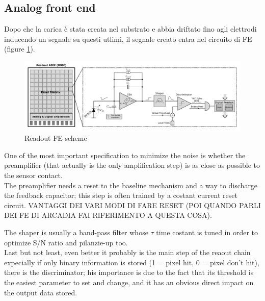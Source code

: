 \begin{titlepage}
\subsection{Analog front end }
Dopo che la carica è stata creata nel substrato e abbia driftato fino agli elettrodi
inducendo un segnale su questi utlimi, il segnale creato entra nel circuito di FE
(figure \ref{fig:readout_scheme}).
\begin{figure}
\centering\includegraphics[width=15cm]{figures/readout_scheme.png}
\caption{Readout FE scheme}
\label{fig:readout_scheme}
\end{figure}

One of the most important specification to minimize the noise is whether the preamplifier
(that actually is the only amplification step) is as close as possible to the sensor contact.\\
The preamplifier needs a reset to the baseline mechanism and a way to discharge
the feedback capacitor; this step is often trained by a costant current reset circuit.
VANTAGGI DEI VARI MODI DI FARE RESET (POI QUANDO PARLI DEI FE DI ARCADIA FAI RIFERIMENTO A QUESTA COSA).

The shaper is usually a band-pass filter whose $\tau$ time costant is tuned in
order to optimize S/N ratio and pilanzie-up too.\\

Last but not least, even better it probably is the main step of the reaout chain
expecially if only binary information is stored (1 = pixel hit, 0 = pixel don't hit),
there is the discriminator; his importance is due to the fact that its threshold
is the easiest parameter to set and change, and it has an obvious direct impact
on the output data stored.\\


\end{titlepage}
